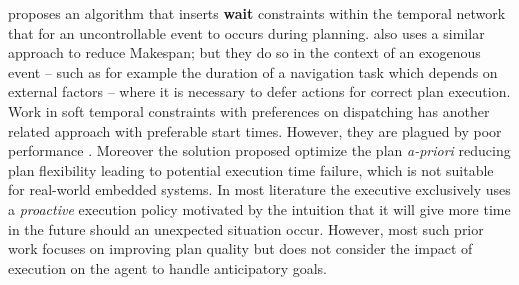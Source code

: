 
\cite{morris01} proposes an algorithm that inserts \textbf{wait}
constraints within the temporal network that for an uncontrollable
event to occurs during planning. \cite{gallien2006} also uses a
similar approach to reduce Makespan; but they do so in the context of
an exogenous event -- such as for example the duration of a navigation
task which depends on external factors -- where it is necessary to
defer actions for correct plan execution. Work in soft temporal
constraints with preferences \cite{khatib2001temporal} on dispatching
has another related approach with preferable start times. However,
they are plagued by poor performance \cite{bartak2002} . %
Moreover the solution proposed optimize the plan {\em a-priori}
reducing plan flexibility leading to potential execution time failure,
which is not suitable for real-world embedded systems. In most
literature the executive exclusively uses a {\em proactive} execution
policy motivated by the intuition that it will give more time in the
future should an unexpected situation occur. However, most such prior
work focuses on improving plan quality but does not consider the
impact of execution on the agent to handle anticipatory goals.

